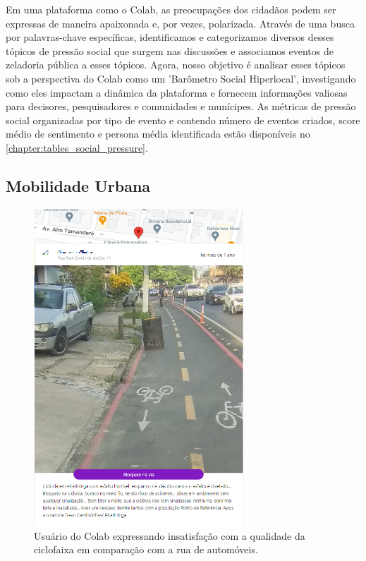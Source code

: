 Em uma plataforma como o Colab, as preocupações dos cidadãos podem ser expressas de maneira apaixonada e, por vezes, polarizada. Através de uma busca por palavras-chave específicas, identificamos e categorizamos diversos desses tópicos de pressão social que surgem nas discussões e associamos eventos de zeladoria pública a esses tópicos. Agora, nosso objetivo é analisar esses tópicos sob a perspectiva do Colab como um 'Barômetro Social Hiperlocal', investigando como eles impactam a dinâmica da plataforma e fornecem informações valiosas para decisores, pesquisadores e comunidades e munícipes. As métricas de pressão social organizadas por tipo de evento e contendo número de eventos criados, score médio de sentimento e persona média identificada estão disponíveis no \autoref{chapter:tables_social_pressure}.

\subsection{Mobilidade Urbana}
\label{section:mobilidade-urbana}

\begin{figure}[htb]
	\centering
	\includegraphics[width=0.7\textwidth]{images/colab_posts_mobility.png}
	\caption{Usuário do Colab expressando insatisfação com a qualidade da ciclofaixa em comparação com a rua de automóveis.}
	\label{fig:colab_posts_mobility}
\end{figure}

